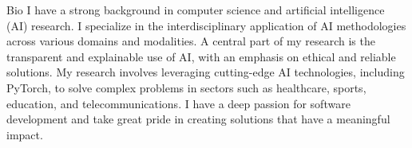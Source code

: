 \begin{rubric}{Bio}
\entry*[]
I have a strong background in computer science and artificial intelligence (AI) research. I specialize in the interdisciplinary application of AI methodologies across various domains and modalities. A central part of my research is the transparent and explainable use of AI, with an emphasis on ethical and reliable solutions. My research involves leveraging cutting-edge AI technologies, including PyTorch, to solve complex problems in sectors such as healthcare, sports, education, and telecommunications. I have a deep passion for software development and take great pride in creating solutions that have a meaningful impact.
\end{rubric}